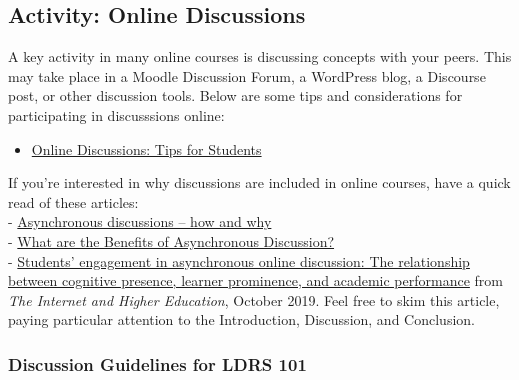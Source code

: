 \documentclass[
]{book}
\providecommand{\tightlist}{%
  \setlength{\itemsep}{0pt}\setlength{\parskip}{0pt}}
\theoremstyle{definition}
\theoremstyle{definition}
\theoremstyle{definition}
\theoremstyle{definition}
\theoremstyle{remark}
\begin{document}
\hypertarget{activity-online-discussions}{%
\subsection*{Activity: Online Discussions}\label{activity-online-discussions}}

\begin{reflect}
A key activity in many online courses is discussing concepts with your peers. This may take place in a Moodle Discussion Forum, a WordPress blog, a Discourse post, or other discussion tools. Below are some tips and considerations for participating in discusssions online:

\begin{itemize}
\tightlist
\item
  \href{https://uwaterloo.ca/centre-for-teaching-excellence/catalogs/tip-sheets/online-discussions-tips-students}{Online Discussions: Tips for Students}
\end{itemize}

If you're interested in why discussions are included in online courses, have a quick read of these articles:\\
- \href{https://www.timeshighereducation.com/campus/asynchronous-discussions-how-and-why}{Asynchronous discussions -- how and why}\\
- \href{https://adjunctworld.com/blog/what-are-the-benefits-of-asynchronous-discussion/}{What are the Benefits of Asynchronous Discussion?}\\
- \href{https://twu.idm.oclc.org/login?url=https://search.ebscohost.com/login.aspx?direct=true\&db=edselp\&AN=S1096751619304105\&site=eds-live\&scope=site}{Students' engagement in asynchronous online discussion: The relationship between cognitive presence, learner prominence, and academic performance} from \emph{The Internet and Higher Education}, October 2019. Feel free to skim this article, paying particular attention to the Introduction, Discussion, and Conclusion.
\end{reflect}

\hypertarget{discussion-guidelines-for-ldrs-101}{%
\subsubsection*{Discussion Guidelines for LDRS 101}\label{discussion-guidelines-for-ldrs-101}}
\end{document}
